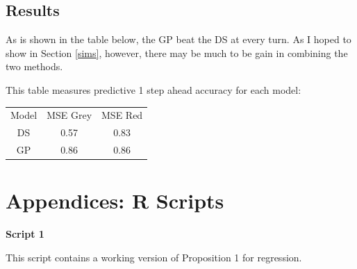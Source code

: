 \documentclass{article}
\begin{document}
	\subsection{Results}
	
	As is shown in the table below, the GP beat the DS at every turn. As I hoped to show in Section \ref{sims}, however, there may be much to be gain in combining the two methods.
	
	This table measures predictive 1 step ahead accuracy for each model:
	
	\begin{center}
		\begin{tabular}{ c c c }
			Model & MSE Grey & MSE Red \\ 
			DS & 0.57 & 0.83 \\  
			GP & 0.86 & 0.86
		\end{tabular}
	\end{center}
	
	
	
	{}
	
	
	\section{Appendices: R Scripts}
	
	\textbf{Script 1}
	
	This script contains a working version of Proposition 1 for regression.
	
\end{document}
